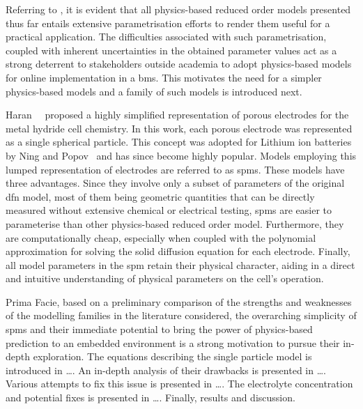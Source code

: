 Referring  to   ,  it   is  evident   that  all
physics-based  reduced  order  models   presented  thus  far  entails  extensive
parametrisation efforts   to render  them useful for a  practical application.
The  difficulties associated  with such  parametrisation, coupled  with inherent
uncertainties  in  the obtained  parameter  values  act  as a  strong  deterrent
to  stakeholders  outside academia  to  adopt  physics-based models  for  online
implementation  in  a   \gls{bms}.  This  motivates  the  need   for  a  simpler
physics-based models and a family of such models is introduced next.


Haran~\etal{}~\cite{Haran1998}  proposed a  highly simplified  representation of
porous  electrodes for  the metal  hydride cell  chemistry. In  this work,  each
porous electrode  was represented as  a single spherical particle.  This concept
was adopted for Lithium ion batteries  by Ning and Popov~\cite{Ning2004} and has
since  become highly  popular. Models  employing this  lumped representation  of
electrodes  are referred  to as  \gls{spm}s. These  models have  three advantages.
Since  they involve  only  a  subset of  parameters  of  the original  \gls{dfn}
model, most  of them being  geometric quantities  that can be  directly measured
without  extensive chemical  or  electrical testing,  \gls{spm}s  are easier  to
parameterise than other physics-based reduced order model. Furthermore, they are
computationally cheap, especially when coupled with the polynomial approximation
for solving the solid diffusion equation for each electrode. Finally, all model
parameters in the \gls{spm} retain their physical character, aiding in a direct
and intuitive understanding of physical parameters on the cell's operation.


Prima Facie, based  on a preliminary comparison of the  strengths and weaknesses
of  the  modelling  families  in  the  literature  considered,  the  overarching
simplicity of  \gls{spm}s and their  immediate potential  to bring the  power of
physics-based prediction  to an embedded  environment is a strong  motivation to
pursue their in-depth exploration. The  equations describing the single particle
model  is introduced  in  \ldots. An  in-depth analysis  of  their drawbacks  is
presented in \ldots. Various attempts to  fix this issue is presented in \ldots.
The  electrolyte  concentration and  potential  fixes  is presented  in  \ldots.
Finally, results and discussion. 


